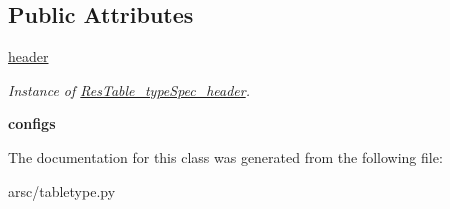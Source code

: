 \subsection*{Public Attributes}
\begin{DoxyCompactItemize}
\item 
\mbox{\label{classarsc_1_1tabletype_1_1ResTable__typeSpec_a1defbb9dd0346ae4733f2d795c0d093f}} 
\mbox{\hyperlink{classarsc_1_1tabletype_1_1ResTable__typeSpec_a1defbb9dd0346ae4733f2d795c0d093f}{header}}
\begin{DoxyCompactList}\small\item\em Instance of \mbox{\hyperlink{classarsc_1_1tabletype_1_1ResTable__typeSpec__header}{Res\+Table\+\_\+type\+Spec\+\_\+header}}. \end{DoxyCompactList}\item 
\mbox{\label{classarsc_1_1tabletype_1_1ResTable__typeSpec_a8d6e6e78e4911655264bc5ae3ac83981}} 
{\bfseries configs}
\end{DoxyCompactItemize}


The documentation for this class was generated from the following file\+:\begin{DoxyCompactItemize}
\item 
arsc/tabletype.\+py\end{DoxyCompactItemize}
